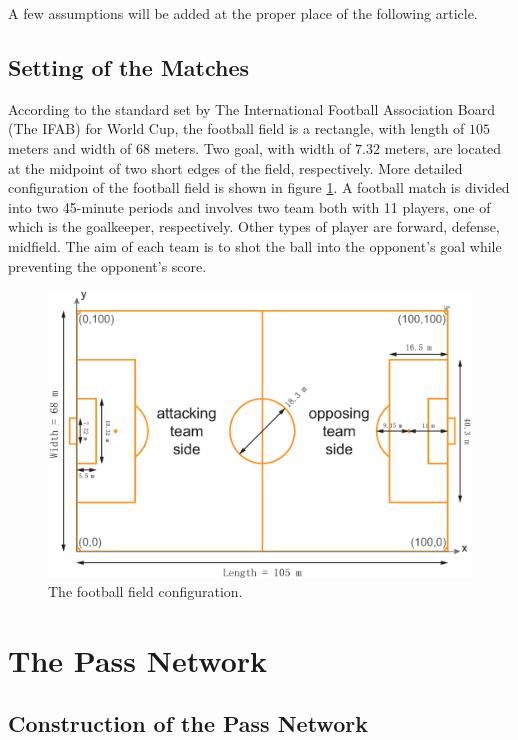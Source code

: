\documentclass[12pt]{article}
\begin{document}
A few assumptions will be added at the proper place of the following article.

\subsection{Setting of the Matches}
According to the standard set by The International Football Association Board (The IFAB) for World Cup, the football field is a rectangle, with length of $105$ meters and width of $68$ meters. Two goal, with width of $7.32$ meters, are located at the midpoint of two short edges of the field, respectively. More detailed configuration of the football field is shown in figure \ref{The football field configuration}. A football match is divided into two 45-minute periods and involves two team both with 11 players, one of which is the goalkeeper, respectively. Other types of player are forward, defense, midfield. The aim of each team is to shot the ball into the opponent's goal while preventing the opponent's score.
\begin{figure}[h]
	\centering
	\includegraphics[width=.8\textwidth]{FootballField.eps}
	\caption{The football field configuration.}
	\label{The football field configuration}
\end{figure}

\section{The Pass Network}

\subsection{Construction of the Pass Network}
\end{document}
